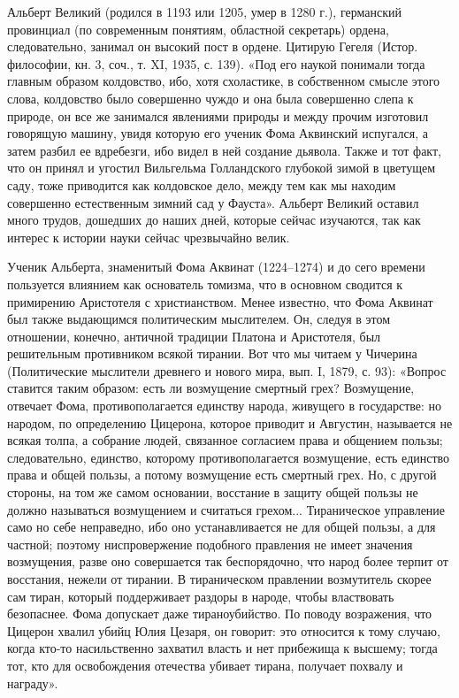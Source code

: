 Альберт Великий (родился в 1193 или  1205, умер в 1280 г.), германский
провинциал  (по  современным  понятиям, областной  секретарь)  ордена,
следовательно,  занимал  он  высокий  пост в  ордене.  Цитирую  Гегеля
(Истор. философии, кн. 3, соч., т.  XI, 1935, с. 139). «Под его наукой
понимали  тогда главным  образом колдовство,  ибо, хотя  схоластике, в
собственном смысле этого слова, колдовство было совершенно чуждо и она
была совершенно слепа к природе, он все же занимался явлениями природы
и между  прочим изготовил говорящую  машину, увидя которую  его ученик
Фома Аквинский испугался, а затем разбил ее вдребезги, ибо видел в ней
создание дьявола. Также и тот факт, что он принял и угостил Вильгельма
Голландского  глубокой  зимой в  цветущем  саду,  тоже приводится  как
колдовское  дело, между  тем  как мы  находим совершенно  естественным
зимний сад у  Фауста». Альберт Великий оставил  много трудов, дошедших
до наших  дней, которые  сейчас изучаются, так  как интерес  к истории
науки сейчас чрезвычайно велик.

Ученик  Альберта,  знаменитый  Фома  Аквинат (1224--1274)  и  до  сего
времени  пользуется влиянием  как основатель  томизма, что  в основном
сводится к примирению Аристотеля  с христианством. Менее известно, что
Фома Аквинат был также  выдающимся политическим мыслителем. Он, следуя
в этом отношении, конечно, античной традиции Платона и Аристотеля, был
решительным противником всякой  тирании. Вот что мы  читаем у Чичерина
(Политические мыслители древнего и нового  мира, вып. I, 1879, с. 93):
«Вопрос  ставится таким  образом:  есть ли  возмущение смертный  грех?
Возмущение, отвечает Фома, противополагается единству народа, живущего
в государстве: но народом, по определению Цицерона, которое приводит и
Августин,  называется не  всякая  толпа, а  собрание людей,  связанное
согласием права  и общением пользы; следовательно,  единство, которому
противополагается возмущение,  есть единство  права и общей  пользы, а
потому возмущение есть смертный грех. Но,  с другой стороны, на том же
самом основании, восстание в защиту  общей пользы не должно называться
возмущением и считаться грехом... Тираническое управление само но себе
неправедно,  ибо  оно  устанавливается  не для  общей  пользы,  а  для
частной; поэтому ниспровержение подобного  правления не имеет значения
возмущения, разве  оно совершается  так беспорядочно, что  народ более
терпит  от  восстания, нежели  от  тирании.  В тираническом  правлении
возмутитель скорее  сам тиран, который поддерживает  раздоры в народе,
чтобы властвовать  безопаснее. Фома допускает даже  тираноубийство. По
поводу возражения, что  Цицерон хвалил убийц Юлия  Цезаря, он говорит:
это  относится  к тому  случаю,  когда  кто-то насильственно  захватил
власть  и нет  прибежища к  высшему; тогда  тот, кто  для освобождения
отечества убивает тирана, получает похвалу и награду».

